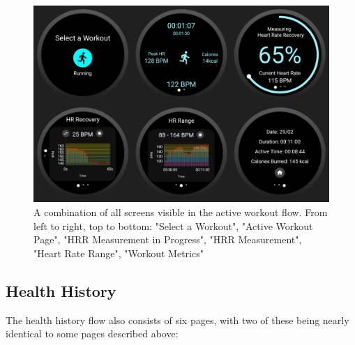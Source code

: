 \documentclass{l4proj}
\begin{document}
\begin{figure}[h!]
    \centering
    \includegraphics[width=0.88\linewidth]{dissertation//dissImages/ActiveWorkoutCombined.png}
    \caption{A combination of all screens visible in the active workout flow. From left to right, top to bottom: "Select a Workout", "Active Workout Page", "HRR Measurement in Progress", "HRR Measurement", "Heart Rate Range", "Workout Metrics"}
    \label{fig:activeworkoutdesign}
\end{figure}

\subsection{Health History}
\label{sec:healthhistory}

The health history flow also consists of six pages, with two of these being nearly identical to some pages described above:
\end{document}
